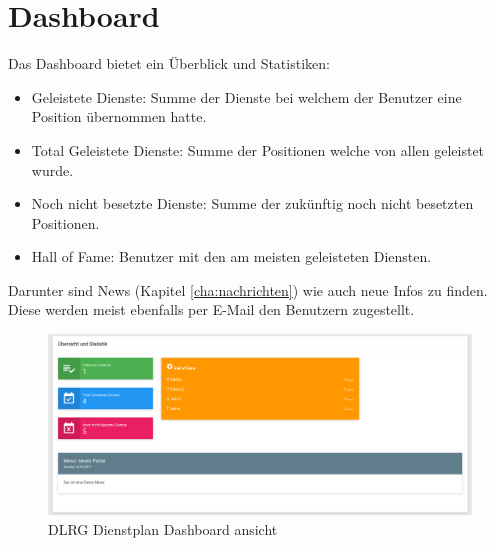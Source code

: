 \chapter{Dashboard}
\label{cha:dashboard}

Das Dashboard bietet ein Überblick und Statistiken:

\begin{itemize}
\item Geleistete Dienste: Summe der Dienste bei welchem der Benutzer eine Position übernommen hatte.
\item Total Geleistete Dienste: Summe der Positionen welche von allen geleistet wurde.
\item Noch nicht besetzte Dienste: Summe der zukünftig noch nicht besetzten Positionen.
\item Hall of Fame: Benutzer mit den am meisten geleisteten Diensten. 
\end{itemize}

\noindent Darunter sind News (Kapitel \ref{cha:nachrichten}) wie auch neue Infos zu finden. Diese werden meist ebenfalls per E-Mail den Benutzern zugestellt.

\begin{figure}[h]
 \begin{addmargin}{-0.2\linewidth}
   \centering 
   \includegraphics[width=20cm]{Bilder/view_overview.png}
 \end{addmargin} 
 \caption[Dashboard ansicht]{DLRG Dienstplan Dashboard ansicht}
 \label{fig:view_overview}
\end{figure}
